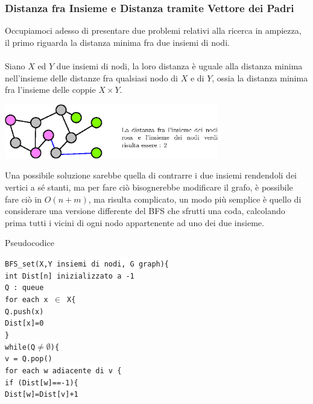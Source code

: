 \documentclass[12pt, letterpaper]{article}
\newcommand{\codee}[1]{\colorbox{white}{\texttt{#1}}}
\newcommand{\acc}{\\\hphantom{}\\}
\begin{document}
\subsubsection{Distanza fra Insieme e Distanza tramite Vettore dei Padri}
Occupiamoci adesso di presentare due problemi relativi alla ricerca in ampiezza, il primo riguarda la distanza minima fra
due insiemi di nodi.\acc
Siano $X$ ed $Y$ due insiemi di nodi, la loro distanza è uguale alla distanza minima nell'insieme delle distanze fra qualsiasi
nodo di $X$ e di $Y$, ossia la distanza minima fra l'insieme delle coppie $X\times Y$. \begin{center}
    \includegraphics[width=0.7\textwidth ]{images/distInsiemi.eps}
\end{center}
Una possibile soluzione sarebbe quella di contrarre i due insiemi rendendoli dei vertici a sé stanti, ma per fare ciò
bisognerebbe modificare il grafo, è possibile fare ciò in $O(n+m)$, ma risulta complicato, un modo più semplice è
quello di considerare una versione differente del BFS che sfrutti una coda, calcolando prima tutti i vicini
di ogni nodo appartenente ad uno dei due insieme.\begin{center}
    Pseudocodice
\end{center}
\codee{BFS\_set(X,Y insiemi di nodi, G graph)\{}\\
\hphantom{ident}\codee{int Dist[n] inizializzato a -1}\\
\hphantom{ident}\codee{Q : queue}\\
\hphantom{ident}\codee{for each x $\in$ X\{}\\
\hphantom{ident}\hphantom{ident}\codee{Q.push(x)}\\
\hphantom{ident}\hphantom{ident}\codee{Dist[x]=0}\\
\hphantom{ident}\codee{\}}\\
\hphantom{ident}\codee{while(Q$\ne\emptyset$)\{}\\
\hphantom{ident}\hphantom{ident}\codee{v = Q.pop()}\\
\hphantom{ident}\hphantom{ident}\codee{for each w adiacente di v \{}\\
\hphantom{ident}\hphantom{ident}\hphantom{ident}\codee{if (Dist[w]==-1)\{}\\
\hphantom{ident}\hphantom{ident}\hphantom{ident}\codee{}\hphantom{ident}\codee{Dist[w]=Dist[v]+1}\\
\end{document}
